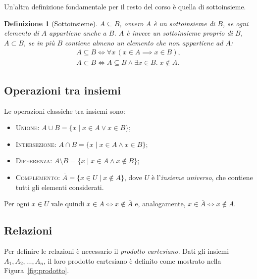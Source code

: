\documentclass[a4paper, 11pt, oneside]{book}
\theoremstyle{formale}
\newtheorem*{definition}{Definizione}
\begin{document}
    Un'altra definizione fondamentale per il resto del corso \`e quella di sottoinsieme.

    \begin{definition}[Sottoinsieme]
        $A \subseteq B$, ovvero $A$ \`e un \emph{sottoinsieme} di $B$, se ogni elemento di
        $A$ appartiene anche a $B$. $A$ \`e invece un \emph{sottoinsieme proprio} di $B$,
        $A \subset B$, se in pi\`u $B$ contiene almeno un elemento che non appartiene ad $A$:
        \begin{gather*}
            A \subseteq B \iff \forall x \, (x \in A \implies x \in B), \\
            A \subset B \iff A \subseteq B \land \exists x \in B.\; x \notin A.
        \end{gather*}
    \end{definition}

    \subsection{Operazioni tra insiemi}
    \label{sec:operazioni-insiemi}
    Le operazioni classiche tra insiemi sono:
    \begin{itemize}
        \item \textsc{Unione}: $A \cup B = \{x \mid x \in A \lor x \in B\}$;
        \item \textsc{Intersezione}: $A \cap B = \{x \mid x \in A \land x \in B\}$;
        \item \textsc{Differenza}: $A \setminus B = \{x \mid x \in A \land x \notin B\}$;
        \item \textsc{Complemento}: $\overline{A} = \{x \in U \mid x \notin A\}$, dove $U$
            \`e l'\emph{insieme universo}, che contiene tutti gli elementi considerati.
    \end{itemize}
    Per ogni $x \in U$ vale quindi $x \in A \iff x \notin \overline{A}$ e, analogamente,
    $x \in \overline{A} \iff x \notin A$.

    \subsection{Relazioni}
    Per definire le relazioni \`e necessario il \emph{prodotto cartesiano}. Dati gli insiemi
    $A_1, A_2, \dots, A_n$, il loro prodotto cartesiano \`e definito come mostrato nella
    Figura~\ref{fig:prodotto}.
\end{document}
